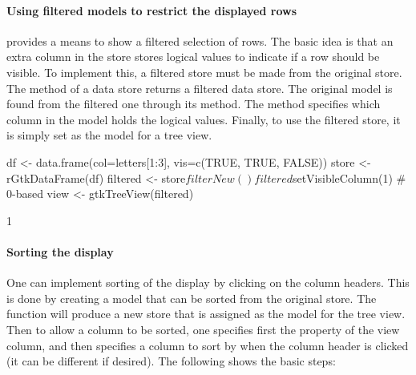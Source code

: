 \paragraph{Using filtered models to restrict the displayed rows}
\GTK\/ provides a means to show a filtered selection of rows. The
basic idea is that an extra column in the store stores logical values
to indicate if a row should be visible. To implement this, a filtered
store must be made from the original store. The
 method of a data store returns a
filtered data store. The original model is found from the filtered one
through its  method. The method
 specifies which column
in the model holds the logical values.  Finally, to use the filtered store, it is simply set as
the model for a tree view.

\begin{Schunk}
\begin{Sinput}
 df <- data.frame(col=letters[1:3], vis=c(TRUE, TRUE, FALSE))
 store <- rGtkDataFrame(df)
 filtered <- store$filterNew()
 filtered$setVisibleColumn(1)            # 0-based
 view <- gtkTreeView(filtered)
\end{Sinput}
\end{Schunk}

\begin{Schunk}
\begin{Soutput}
[1] 1
\end{Soutput}
\end{Schunk}

\paragraph{Sorting the display}
One can implement sorting of the display by clicking on the column
headers. This is done by creating a model that can be sorted from the
original store. The function 
will produce a new store that is assigned as the model for the tree
view. Then to allow a column to be sorted, one specifies first the
 property of the view column, and then specifies a
column to sort by when the column header is clicked (it can be
different if desired). The following shows the basic steps:

